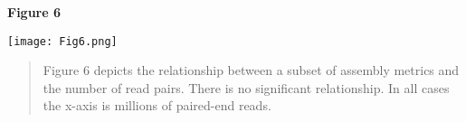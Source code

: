 \documentclass[10pt,letterpaper]{article}
\begin{document}
\textbf{\hypertarget{Figure 6}{Figure 6}} \\
\centerline{\texttt{[image: Fig6.png]}}
\begin{quote}
\small{Figure 6 depicts the relationship between a subset of assembly metrics and the number of read pairs. There is no significant relationship. In all cases the x-axis is millions of paired-end reads. }
\end{quote}







\end{document}
